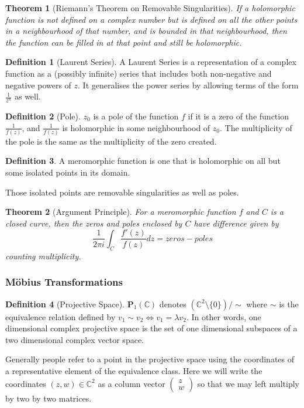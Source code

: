 \documentclass{article}
\newtheorem{thm}{Theorem}[section]
\theoremstyle{definition}
\newtheorem{definition}{Definition}[section]
\theoremstyle{definition}
\theoremstyle{definition}
\newcommand{\C}{\mathbb{C}}
\begin{document}
\begin{thm}[Riemann's Theorem on Removable Singularities]
    If a holomorphic function is not defined on a complex number but is defined on all the other points in a neighbourhood of that number, and is bounded in that neighbourhood, then the function can be filled in at that point and still be holomorphic.
\end{thm}

\begin{definition}[Laurent Series]
    A Laurent Series is a representation of a complex function as a (possibly infinite) series that includes both non-negative and negative powers of $z$. It generalises the power series by allowing terms of the form $\frac{1}{z^n}$ as well.
\end{definition}

\begin{definition}[Pole]
    $z_0$ is a pole of the function $f$ if it is a zero of the function $\frac{1}{f(z)}$, and $\frac{1}{f(z)}$ is holomorphic in some neighbourhood of $z_0$. The multiplicity of the pole is the same as the multiplicity of the zero created.
\end{definition}

\begin{definition}
    A meromorphic function is one that is holomorphic on all but some isolated points in its domain.
\end{definition}

Those isolated points are removable singularities as well as poles.


\begin{thm}[Argument Principle]\label{argprinciple}For a meromorphic function $f$ and $C$ is a closed curve, then the zeros and poles enclosed by $C$ have difference given by
$$\frac{1}{2\pi i}\int_C\frac{f'(z)}{f(z)}dz= zeros-poles$$
counting multiplicity.
\end{thm}
\subsubsection{M\"{o}bius Transformations}
\begin{definition} [Projective Space]$\boldsymbol{P}_1(\C)$ denotes $(\C^{2}\setminus\{0\})/\sim$ where $\sim$ is the equivalence relation defined by $v_1\sim v_2\iff v_1=\lambda v_2$. In other words, one dimensional complex projective space is the set of one dimensional subspaces of a two dimensional complex vector space.
\end{definition}
Generally people refer to a point in the projective space using the coordinates of a representative element of the equivalence class. Here we will write the coordinates $(z,w)\in\C^2$ as a column vector $\begin{pmatrix}z\\w\end{pmatrix}$ so that we may left multiply by two by two matrices.
\end{document}
